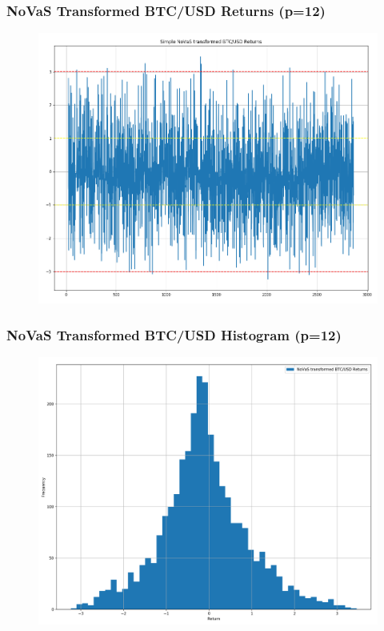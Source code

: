\documentclass{beamer}
\begin{document}
\begin{frame}
\frametitle{NoVaS Transformed BTC/USD Returns (p=12)}
\begin{figure}[h!]
\centering 
\includegraphics[width=\textwidth]{novas_btc_returns.png}
\end{figure}
\end{frame}

\begin{frame}
\frametitle{NoVaS Transformed BTC/USD Histogram (p=12)}
\begin{figure}[h!]
\centering 
\includegraphics[width=\textwidth]{novas_btc_returns_hist.png}
\end{figure}
\end{frame}
\end{document}
